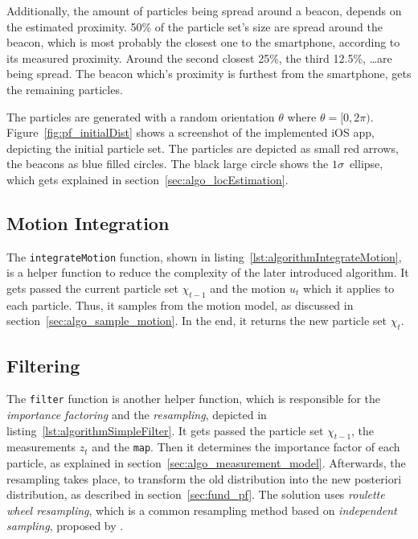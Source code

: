 Additionally, the amount of particles being spread around a beacon, depends on the estimated proximity. 50\% of the particle set's size are spread around the beacon, which is most probably the closest one to the smartphone, according to its measured proximity. Around the second closest 25\%, the third 12.5\%, \ldots are being spread. The beacon which's proximity is furthest from the smartphone, gets the remaining particles.

The particles are generated with a random orientation $\theta$ where $\theta = [0, 2\pi)$. Figure~\ref{fig:pf_initialDist} shows a screenshot of the implemented iOS app, depicting the initial particle set. The particles are depicted as small red arrows, the beacons as blue filled circles. The black large circle shows the $1\sigma$~ellipse, which gets explained in section~\ref{sec:algo_locEstimation}.


\subsection{Motion Integration}
The \texttt{integrateMotion} function, shown in listing~\ref{lst:algorithmIntegrateMotion}, is a helper function to reduce the complexity of the later introduced algorithm. It gets passed the current particle set $\chi_{t-1}$ and the motion $u_t$ which it applies to each particle. Thus, it samples from the motion model, as discussed in section~\ref{sec:algo_sample_motion}. In the end, it returns the new particle set $\chi_t$.




\subsection{Filtering}
The \texttt{filter} function is another helper function, which is responsible for the \emph{importance factoring} and the \emph{resampling}, depicted in listing~\ref{lst:algorithmSimpleFilter}. It gets passed the particle set $\chi_{t-1}$, the measurements $z_t$ and the \texttt{map}. Then it determines the importance factor of each particle, as explained in section~\ref{sec:algo_measurement_model}. Afterwards, the resampling takes place, to transform the old distribution into the new posteriori distribution, as described in section~\ref{sec:fund_pf}. The solution uses \emph{roulette wheel resampling}, which is a common resampling method based on \emph{independent sampling}, proposed by \citet[p. 108--111]{thrun:prob_robo}.

